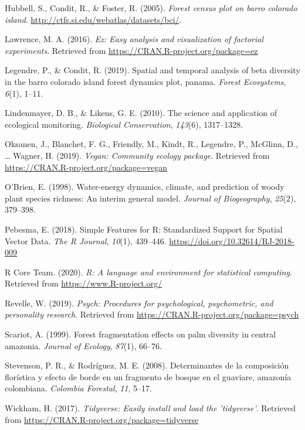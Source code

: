 \documentclass[11pt,]{article}
\begin{document}
\hypertarget{ref-Hubbell2005Barro}{}
Hubbell, S., Condit, R., \& Foster, R. (2005). \emph{Forest census plot
on barro colorado island}.
\url{http://ctfs.si.edu/webatlas/datasets/bci/}.

\hypertarget{ref-EZ}{}
Lawrence, M. A. (2016). \emph{Ez: Easy analysis and visualization of
factorial experiments}. Retrieved from
\url{https://CRAN.R-project.org/package=ez}

\hypertarget{ref-legendre2019spatial}{}
Legendre, P., \& Condit, R. (2019). Spatial and temporal analysis of
beta diversity in the barro colorado island forest dynamics plot,
panama. \emph{Forest Ecosystems}, \emph{6}(1), 1--11.

\hypertarget{ref-lindenmayer2010science}{}
Lindenmayer, D. B., \& Likens, G. E. (2010). The science and application
of ecological monitoring. \emph{Biological Conservation}, \emph{143}(6),
1317--1328.

\hypertarget{ref-VeganPack}{}
Oksanen, J., Blanchet, F. G., Friendly, M., Kindt, R., Legendre, P.,
McGlinn, D., \ldots{} Wagner, H. (2019). \emph{Vegan: Community ecology
package}. Retrieved from \url{https://CRAN.R-project.org/package=vegan}

\hypertarget{ref-o1998water}{}
O'Brien, E. (1998). Water-energy dynamics, climate, and prediction of
woody plant species richness: An interim general model. \emph{Journal of
Biogeography}, \emph{25}(2), 379--398.

\hypertarget{ref-sfpackage}{}
Pebesma, E. (2018). Simple Features for R: Standardized Support for
Spatial Vector Data. \emph{The R Journal}, \emph{10}(1), 439--446.
\url{https://doi.org/10.32614/RJ-2018-009}

\hypertarget{ref-RSoft}{}
R Core Team. (2020). \emph{R: A language and environment for statistical
computing}. Retrieved from \url{https://www.R-project.org/}

\hypertarget{ref-psych}{}
Revelle, W. (2019). \emph{Psych: Procedures for psychological,
psychometric, and personality research}. Retrieved from
\url{https://CRAN.R-project.org/package=psych}

\hypertarget{ref-scariot1999forest}{}
Scariot, A. (1999). Forest fragmentation effects on palm diversity in
central amazonia. \emph{Journal of Ecology}, \emph{87}(1), 66--76.

\hypertarget{ref-stevenson2008determinantes}{}
Stevenson, P. R., \& Rodríguez, M. E. (2008). Determinantes de la
composición florística y efecto de borde en un fragmento de bosque en el
guaviare, amazonía colombiana. \emph{Colombia Forestal}, \emph{11},
5--17.

\hypertarget{ref-Tidyverse}{}
Wickham, H. (2017). \emph{Tidyverse: Easily install and load the
'tidyverse'}. Retrieved from
\url{https://CRAN.R-project.org/package=tidyverse}




\newpage
\singlespacing 
\end{document}
